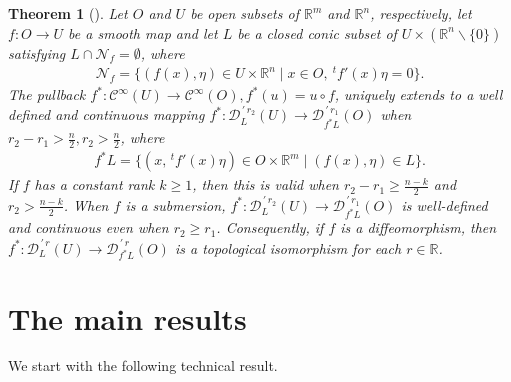 \documentclass{amsart}
\newtheorem{theorem}{Theorem}[section]
\theoremstyle{definition}
\begin{document}
\begin{theorem}[{\cite[Theorem 3.21]{PP}}]
\label{PPteorema}
    Let $O$ and $U$ be open subsets of $\mathbb{R}^m$ and $\mathbb{R}^n$, respectively, let $f:O \to U$ be a smooth map and let $L$ be a closed conic subset of $U\times (\mathbb{R}^n \backslash \{ 0 \})$ satisfying $L\cap \mathcal{N}_f = \emptyset$, where
    \begin{align*}
        \mathcal{N}_f = \{ (f(x), \eta) \in U \times \mathbb{R}^n \mid x\in O, \ ^t f'(x) \eta = 0 \}.
    \end{align*}
    The pullback $f^*: \mathcal{C}^{\infty}(U) \to \mathcal{C}^{\infty}(O), f^*(u)=u\circ f$, uniquely extends to a well defined and continuous mapping $f^*: \mathcal{D}_{L}^{\,\prime\, r_2}  (U) \to \mathcal{D}_{f^* L}^{\,\prime\, r_1} (O)$ when $r_2 - r_1>\frac{n}{2} , r_2 > \frac{n}{2}$, where
    \begin{align}
    \label{pullback_skupa}
        f^*L = \{ (x, \, ^tf'(x)\eta)\in O \times\mathbb{R}^m \mid (f(x),\eta)\in L \}.
    \end{align}
    If $f$ has a constant rank $k\geq 1$, then this is valid when $r_2-r_1\geq \frac{n-k}{2}$ and $r_2 > \frac{n-k}{2}$. When $f$ is a submersion, $f^*: \mathcal{D}_{L}^{\,\prime\, r_2}  (U) \to \mathcal{D}_{f^* L}^{\,\prime\, r_1} (O)$ is well-defined and continuous even when $r_2\geq r_1$. Consequently, if $f$ is a diffeomorphism, then $f^*: \mathcal{D}_{L}^{\,\prime\, r}  (U) \to \mathcal{D}_{f^* L}^{\,\prime\, r} (O)$ is a topological isomorphism for each $r\in\mathbb{R}$.
\end{theorem}



\section{The main results}\label{sec3} 

We start with the following technical result.
\end{document}
